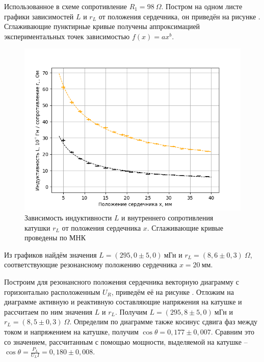 \documentclass[a4paper,10pt]{article}
\begin{document}
Использованное в схеме сопротивление $R_1=98~\Omega$. Постром на одном листе графики зависимостей $L$ и $r_L$ от положения сердечника, он приведён на рисунке . Сглаживающие пунктирные кривые получены аппроксимацией экспериментальных точек зависимостью $f\left(x\right)=ax^b$.

\begin{figure}[h]
	\centering
	\includegraphics[scale=0.70]{Main_Plot}
	\caption{Зависимость индуктивности $L$ и внутреннего сопротивления катушки $r_L$ от положения сердечника $x$. Сглаживающие кривые проведены по МНК} \label{Main_Plot}
\end{figure}

Из графиков найдём значения $L=\left(295,0\pm5,0\right)~\text{мГн}$ и $r_L=\left(8,6\pm0,3\right)~\Omega$, соответствующие резонансному положению сердечника $x=20~\text{мм}$.

Построим для резонансного положения сердечника векторную диаграмму с горизонтально расположенным $U_R$, приведём её на рисунке . Отложим на диаграмме активную и реактивную составляющие напряжения на катушке и рассчитаем по ним значения $L$ и $r_L$. Получим $L=\left(295,8\pm5,0\right)~\text{мГн}$ и $r_L=\left(8,5\pm0,3\right)~\Omega$. Определим по диаграмме также косинус сдвига фаз между током и напряжением на катушке, получим $\cos{\theta}=0,177\pm0,007$. Сравним это со значением, рассчитанным с помощью мощности, выделяемой на катушке -- $\cos{\theta}=\frac{P_L}{U_LI}=0,180\pm0,008$.
\end{document}
